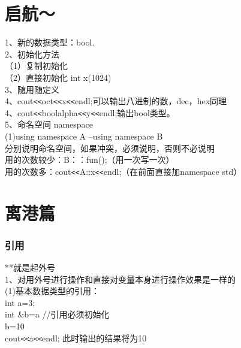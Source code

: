 \documentclass[a4paper,12pt]{article}
\begin{document}
\begin{CJK*}{UTF8}{gbsn}%

 

\part{启航～ }

\begin{flushleft}
1、新的数据类型：bool.\\
2、初始化方法\\
（1）复制初始化\\
（2）直接初始化 int x(1024)\\
3、随用随定义\\
4、cout\verb|<<|oct\verb|<<|x\verb|<<|endl;可以输出八进制的数，dec，hex同理\\
4、cout\verb|<<|boolalpha\verb|<<|y\verb|<<|endl;输出bool类型。\\
5、命名空间   namespace\\
    (1)using namespace A –using namespace B\\
         分别说明命名空间，如果冲突，必须说明，否则不必说明\\
         用的次数较少：B：：fun();（用一次写一次）\\
         用的次数多：cout\verb|<<|A::x\verb|<<|endl;（在前面直接加namespace std）\\
\end{flushleft}
\part{离港篇}
 

   
\section{引用}
\begin{flushleft} 
**就是起外号~\\

1、对用外号进行操作和直接对变量本身进行操作效果是一样的\\
 (1)基本数据类型的引用：\\
\qquad int a=3;\\
\qquad int \&b=a   //引用必须初始化\\
\qquad b=10\\
\qquad cout\verb|<<|a\verb|<<|endl;  此时输出的结果将为10\\


\end{flushleft}
\end{CJK*}
\end{document}
